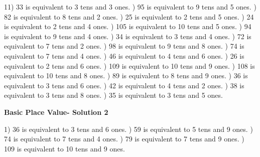 \documentclass{article}%
\begin{document}
11) 33 is equivalent to  3 tens and 3 ones.%
) 95 is equivalent to  9 tens and 5 ones.%
) 82 is equivalent to  8 tens and 2 ones.%
) 25 is equivalent to  2 tens and 5 ones.%
) 24 is equivalent to  2 tens and 4 ones.%
) 105 is equivalent to  10 tens and 5 ones.%
) 94 is equivalent to  9 tens and 4 ones.%
) 34 is equivalent to  3 tens and 4 ones.%
) 72 is equivalent to  7 tens and 2 ones.%
) 98 is equivalent to  9 tens and 8 ones.%
) 74 is equivalent to  7 tens and 4 ones.%
) 46 is equivalent to  4 tens and 6 ones.%
) 26 is equivalent to  2 tens and 6 ones.%
) 109 is equivalent to  10 tens and 9 ones.%
) 108 is equivalent to  10 tens and 8 ones.%
) 89 is equivalent to  8 tens and 9 ones.%
) 36 is equivalent to  3 tens and 6 ones.%
) 42 is equivalent to  4 tens and 2 ones.%
) 38 is equivalent to  3 tens and 8 ones.%
) 35 is equivalent to  3 tens and 5 ones.%
\newline%
\newpage%
\large%
\begin{center}%
\textbf{Basic Place Value- Solution 2}%
\newline%
\end{center} \normalsize%
1) 36 is equivalent to  3 tens and 6 ones.%
) 59 is equivalent to  5 tens and 9 ones.%
) 74 is equivalent to  7 tens and 4 ones.%
) 79 is equivalent to  7 tens and 9 ones.%
) 109 is equivalent to  10 tens and 9 ones.%
\newline%
\end{document}

